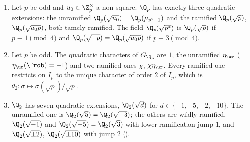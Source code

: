 \begin{proposition}\label{prop:local:quadratic-ext}
\begin{enumerate}[label=(\roman*)]
\item Let $p$ be odd and $u_0\in\Z_p^\times$ a non-square. $\Q_p$ has exactly three quadratic extensions: the unramified $\Q_p(\sqrt{u_0})=\Q_p(\mu_{p^2-1})$ and
the ramified $\Q_p(\sqrt p)$, $\Q_p(\sqrt{u_0p})$, both tamely ramified. The field $\Q_p(\sqrt{p^*})$ is $\Q_p(\sqrt p)$ if $p\equiv1\pmod4$ and $\Q_p(\sqrt{-p})=\Q_p(\sqrt{u_0p})$
if $p\equiv3\pmod4$.
\item Let $p$ be odd. The quadratic characters of $G_{\Q_p}$ are $1$, the unramified $\eta_{\ur}$ ($\eta_{\ur}(\Frob)=-1$) and two ramified ones $\chi$, $\chi\eta_{\ur}$. Every
ramified one restricts on $I_p$ to the unique character of order $2$ of $I_p$, which is $\theta_2\colon\sigma\mapsto\sigma(\sqrt p)/\sqrt p$.
\item $\Q_2$ has seven quadratic extensions, $\Q_2(\sqrt d)$ for $d\in\{-1,\pm5,\pm2,\pm10\}$. The unramified one is $\Q_2(\sqrt5)=\Q_2(\sqrt{-3})$; the others are wildly
ramified, $\Q_2(\sqrt{-1})$ and $\Q_2(\sqrt{-5})=\Q_2(\sqrt3)$ with lower ramification jump $1$, and $\Q_2(\sqrt{\pm2})$, $\Q_2(\sqrt{\pm10})$ with jump $2$
().
\end{enumerate}
\end{proposition}

